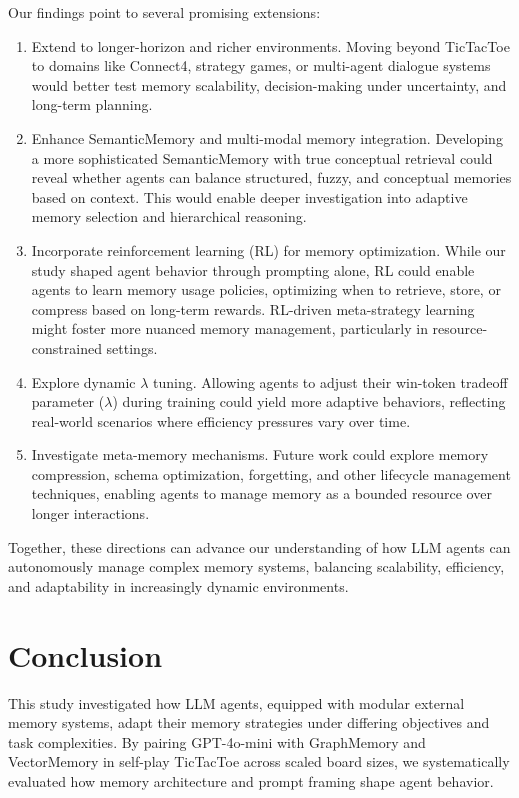 \documentclass[10pt]{article}
\begin{document}
Our findings point to several promising extensions:
\begin{enumerate}
    \item Extend to longer-horizon and richer environments. Moving beyond TicTacToe to domains like Connect4, strategy games, or multi-agent dialogue systems would better test memory scalability, decision-making under uncertainty, and long-term planning.
    
    \item Enhance SemanticMemory and multi-modal memory integration. Developing a more sophisticated SemanticMemory with true conceptual retrieval could reveal whether agents can balance structured, fuzzy, and conceptual memories based on context. This would enable deeper investigation into adaptive memory selection and hierarchical reasoning.
    
    \item Incorporate reinforcement learning (RL) for memory optimization. While our study shaped agent behavior through prompting alone, RL could enable agents to learn memory usage policies, optimizing when to retrieve, store, or compress based on long-term rewards. RL-driven meta-strategy learning might foster more nuanced memory management, particularly in resource-constrained settings.
    
    \item Explore dynamic $\lambda$ tuning. Allowing agents to adjust their win-token tradeoff parameter ($\lambda$) during training could yield more adaptive behaviors, reflecting real-world scenarios where efficiency pressures vary over time.
    
    \item Investigate meta-memory mechanisms. Future work could explore memory compression, schema optimization, forgetting, and other lifecycle management techniques, enabling agents to manage memory as a bounded resource over longer interactions.
\end{enumerate}

Together, these directions can advance our understanding of how LLM agents can autonomously manage complex memory systems, balancing scalability, efficiency, and adaptability in increasingly dynamic environments.

\section{Conclusion}

This study investigated how LLM agents, equipped with modular external memory systems, adapt their memory strategies under differing objectives and task complexities. By pairing GPT-4o-mini with GraphMemory and VectorMemory in self-play TicTacToe across scaled board sizes, we systematically evaluated how memory architecture and prompt framing shape agent behavior.
\end{document}
